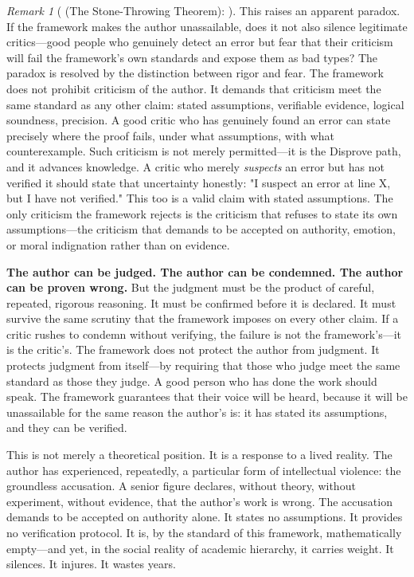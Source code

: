 \documentclass[12pt,a4paper]{article}
\theoremstyle{definition}
\theoremstyle{remark}
\newtheorem{remark}{Remark}[section]
\begin{document}
\begin{remark}[ (The Stone-Throwing Theorem): ]
This raises an apparent paradox. If the framework makes the author unassailable, does it not also silence legitimate critics—good people who genuinely detect an error but fear that their criticism will fail the framework's own standards and expose them as bad types? The paradox is resolved by the distinction between rigor and fear. The framework does not prohibit criticism of the author. It demands that criticism meet the same standard as any other claim: stated assumptions, verifiable evidence, logical soundness, precision. A good critic who has genuinely found an error can state precisely where the proof fails, under what assumptions, with what counterexample. Such criticism is not merely permitted—it is the Disprove path, and it advances knowledge. A critic who merely \textit{suspects} an error but has not verified it should state that uncertainty honestly: "I suspect an error at line X, but I have not verified." This too is a valid claim with stated assumptions. The only criticism the framework rejects is the criticism that refuses to state its own assumptions—the criticism that demands to be accepted on authority, emotion, or moral indignation rather than on evidence.

\textbf{The author can be judged. The author can be condemned. The author can be proven wrong.} But the judgment must be the product of careful, repeated, rigorous reasoning. It must be confirmed before it is declared. It must survive the same scrutiny that the framework imposes on every other claim. If a critic rushes to condemn without verifying, the failure is not the framework's—it is the critic's. The framework does not protect the author from judgment. It protects judgment from itself—by requiring that those who judge meet the same standard as those they judge. A good person who has done the work should speak. The framework guarantees that their voice will be heard, because it will be unassailable for the same reason the author's is: it has stated its assumptions, and they can be verified.

This is not merely a theoretical position. It is a response to a lived reality. The author has experienced, repeatedly, a particular form of intellectual violence: the groundless accusation. A senior figure declares, without theory, without experiment, without evidence, that the author's work is wrong. The accusation demands to be accepted on authority alone. It states no assumptions. It provides no verification protocol. It is, by the standard of this framework, mathematically empty—and yet, in the social reality of academic hierarchy, it carries weight. It silences. It injures. It wastes years.


\end{remark}
\end{document}
